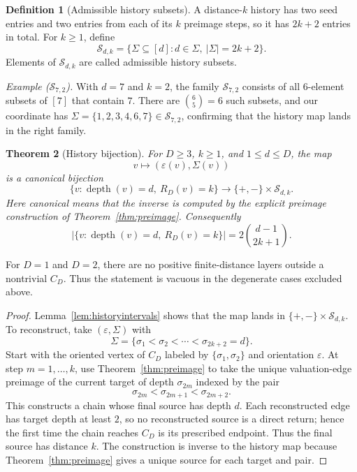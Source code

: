 \documentclass[11pt]{amsart}
\newtheorem{theorem}{Theorem}[section]
\theoremstyle{definition}
\newtheorem{definition}[theorem]{Definition}
\theoremstyle{remark}
\newcommand{\depth}{\operatorname{depth}}
\newcommand{\Sfam}{\mathcal S}
\newcommand{\eps}{\varepsilon}
\begin{document}
\begin{definition}[Admissible history subsets]\label{def:Sfam}
A distance-$k$ history has two seed entries and two entries from each
of its \(k\) preimage steps, so it has \(2k+2\) entries in total.  For
\(k\ge1\), define
\[
\Sfam_{d,k}
=
\{\Sigma\subseteq[d]:d\in\Sigma,\ |\Sigma|=2k+2\}.
\]
Elements of \(\Sfam_{d,k}\) are called admissible history subsets.
\end{definition}

\begin{examplebox}
\textit{Example ($\Sfam_{7,2}$).}
With $d=7$ and $k=2$, the family $\Sfam_{7,2}$ consists of all
$6$-element subsets of $[7]$ that contain $7$.  There are
$\binom{6}{5}=6$ such subsets, and our coordinate has
$\Sigma=\{1,2,3,4,6,7\}\in\Sfam_{7,2}$, confirming that the history
map lands in the right family.
\end{examplebox}

\begin{theorem}[History bijection]\label{thm:bijection}
For $D\ge3$, $k\ge1$, and $1\le d\le D$, the map
\[
v\longmapsto (\eps(v),\Sigma(v))
\]
is a canonical bijection
\[
\{v:\depth(v)=d,\ R_D(v)=k\}
\longrightarrow
\{+,-\}\times\Sfam_{d,k}.
\]
Here canonical means that the inverse is computed by the explicit
preimage construction of Theorem~\ref{thm:preimage}.  Consequently
\[
\bigl|\{v:\depth(v)=d,\ R_D(v)=k\}\bigr|=2\binom{d-1}{2k+1}.
\]
\end{theorem}

For $D=1$ and $D=2$, there are no positive finite-distance layers outside a nontrivial $C_D$.  Thus the statement is vacuous in the degenerate cases excluded above.

\begin{proof}
Lemma~\ref{lem:historyintervals} shows that the map lands in
$\{+,-\}\times\Sfam_{d,k}$.
To reconstruct, take $(\eps,\Sigma)$ with
\[
\Sigma=\{\sigma_1<\sigma_2<\cdots<\sigma_{2k+2}=d\}.
\]
Start with the oriented vertex of $C_D$ labeled by
$\{\sigma_1,\sigma_2\}$ and orientation $\eps$.  At step
$m=1,\ldots,k$, use Theorem~\ref{thm:preimage} to take the unique
valuation-edge preimage of the current target of depth $\sigma_{2m}$
indexed by the pair
\[
\sigma_{2m}<\sigma_{2m+1}<\sigma_{2m+2}.
\]
This constructs a chain whose final source has depth $d$.
Each reconstructed edge has target depth at least $2$, so no
reconstructed source is a direct return; hence the first time the
chain reaches $C_D$ is its prescribed endpoint.  Thus the final source
has distance $k$.  The construction is inverse to the history map
because Theorem~\ref{thm:preimage} gives a unique source for each
target and pair.
\end{proof}
\end{document}
